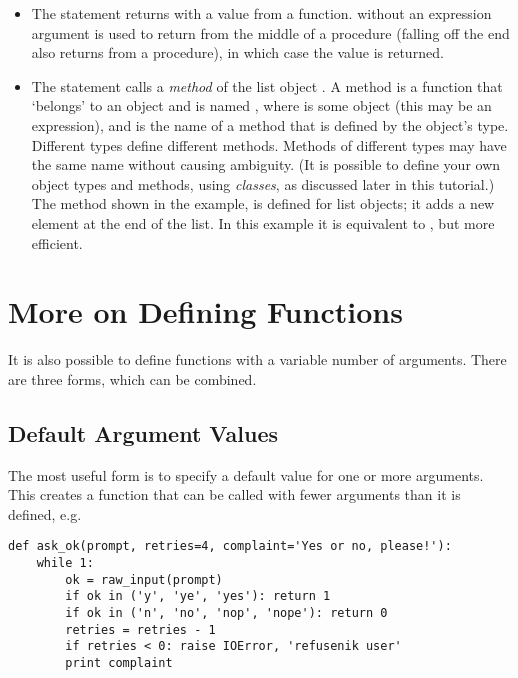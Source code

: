 \documentclass{manual}
\begin{document}
\begin{itemize}

\item
The  statement returns with a value from a function.
 without an expression argument is used to return from 
the middle of a procedure (falling off the end also returns from a
procedure), in which case the  value is returned.

\item
The statement  calls a \emph{method} of the list
object .  A method is a function that `belongs' to an
object and is named , where  is some
object (this may be an expression), and  is the name
of a method that is defined by the object's type.  Different types
define different methods.  Methods of different types may have the
same name without causing ambiguity.  (It is possible to define your
own object types and methods, using \emph{classes}, as discussed later
in this tutorial.)
The method  shown in the example, is defined for
list objects; it adds a new element at the end of the list.  In this
example it is equivalent to , but more
efficient.

\end{itemize}

\section{More on Defining Functions}
\label{defining}

It is also possible to define functions with a variable number of
arguments.  There are three forms, which can be combined.

\subsection{Default Argument Values}
\label{defaultArgs}

The most useful form is to specify a default value for one or more
arguments.  This creates a function that can be called with fewer
arguments than it is defined, e.g.

\begin{verbatim}
def ask_ok(prompt, retries=4, complaint='Yes or no, please!'):
    while 1:
        ok = raw_input(prompt)
        if ok in ('y', 'ye', 'yes'): return 1
        if ok in ('n', 'no', 'nop', 'nope'): return 0
        retries = retries - 1
        if retries < 0: raise IOError, 'refusenik user'
        print complaint
\end{verbatim}
\end{document}
